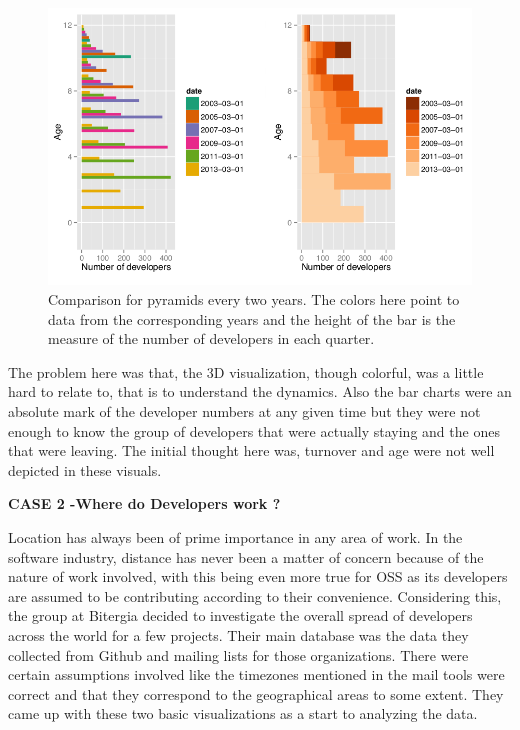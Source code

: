\documentclass[seploa]{beavtex}
\begin{document}
\begin{figure}[!ht]
\centering
\includegraphics[width=130mm]{age1.png}
\caption{Comparison for pyramids every two years. The colors here point to data from the corresponding years and the height of the bar is the measure of the number of developers in each quarter.}
\end{figure}

The problem here was that, the 3D visualization, though colorful, was a little hard to relate to, that is to understand the dynamics. Also the bar charts were an absolute mark of the developer numbers at any given time but they were not enough to know the group of developers that were actually staying and the ones that were leaving. The initial thought here was, turnover and age were not well depicted in these visuals.

 \textbf{CASE 2 -Where do Developers work ?}

Location has always been of prime importance in any area of work. In the software industry, distance has never been a matter of concern because of the nature of work involved, with this being even more true for OSS as its developers are assumed to be contributing according to their convenience\cite{yuri2010}. Considering this, the group at Bitergia decided to investigate the overall spread of developers across the world for a few projects. Their main database was the data they collected from Github and mailing lists for those organizations. There were certain assumptions involved like the timezones mentioned in the mail tools were correct and that they correspond to the geographical areas to some extent. They came up with these two basic visualizations as a start to analyzing the data.
\end{document}
